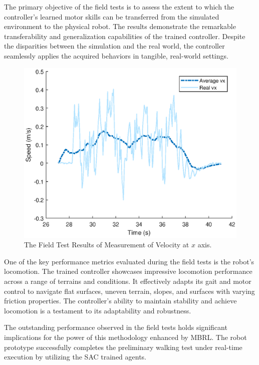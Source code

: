 The primary objective of the field tests is to assess the extent to which the controller's learned motor skills can be transferred from the simulated environment to the physical robot. The results demonstrate the remarkable transferability and generalization capabilities of the trained controller. Despite the disparities between the simulation and the real world, the controller seamlessly applies the acquired behaviors in tangible, real-world settings. 
\begin{figure}[htb]
    \centering
    \includegraphics[width=0.9\linewidth]{img/chap5/real_vx.eps}
    \caption{The Field Test Results of Measurement of Velocity at $x$ axis.}
    \label{fig:real_vx}
\end{figure}

One of the key performance metrics evaluated during the field tests is the robot's locomotion. The trained controller showcases impressive locomotion performance across a range of terrains and conditions. It effectively adapts its gait and motor control to navigate flat surfaces, uneven terrain, slopes, and surfaces with varying friction properties. The controller's ability to maintain stability and achieve locomotion is a testament to its adaptability and robustness.

The outstanding performance observed in the field tests holds significant implications for the power of this methodology enhanced by MBRL. The robot prototype successfully completes the preliminary walking test under real-time execution by utilizing the SAC trained agents.